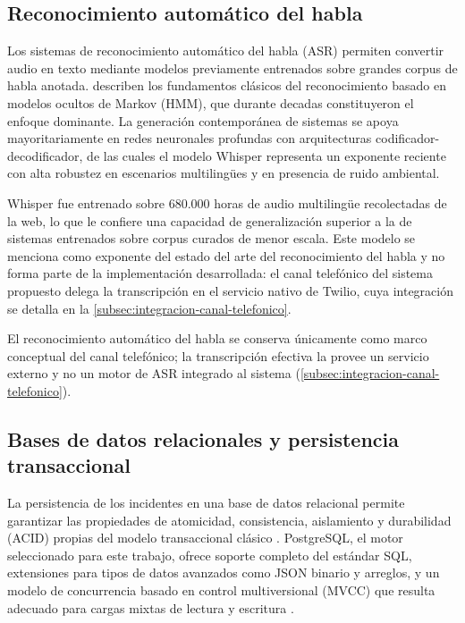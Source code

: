 \subsection{Reconocimiento automático del habla}\label{subsec:reconocimiento-habla}

Los sistemas de reconocimiento automático del habla (ASR) permiten convertir audio en texto mediante modelos previamente entrenados sobre grandes corpus de habla anotada. \textcite{Rabiner1993_speech_recognition} describen los fundamentos clásicos del reconocimiento basado en modelos ocultos de Markov (HMM), que durante decadas constituyeron el enfoque dominante. La generación contemporánea de sistemas se apoya mayoritariamente en redes neuronales profundas con arquitecturas codificador-decodificador, de las cuales el modelo Whisper \parencite{Radford2023_whisper} representa un exponente reciente con alta robustez en escenarios multilingües y en presencia de ruido ambiental.

Whisper fue entrenado sobre 680.000 horas de audio multilingüe recolectadas de la web, lo que le confiere una capacidad de generalización superior a la de sistemas entrenados sobre corpus curados de menor escala. Este modelo se menciona como exponente del estado del arte del reconocimiento del habla y no forma parte de la implementación desarrollada: el canal telefónico del sistema propuesto delega la transcripción en el servicio nativo de Twilio, cuya integración se detalla en la \autoref{subsec:integracion-canal-telefonico}.

El reconocimiento automático del habla se conserva únicamente como marco conceptual del canal telefónico; la transcripción efectiva la provee un servicio externo y no un motor de ASR integrado al sistema (\autoref{subsec:integracion-canal-telefonico}).

\subsection{Bases de datos relacionales y persistencia transaccional}\label{subsec:bd-relacionales}

La persistencia de los incidentes en una base de datos relacional permite garantizar las propiedades de atomicidad, consistencia, aislamiento y durabilidad (ACID) propias del modelo transaccional clásico \parencite{Date2003_database}. PostgreSQL, el motor seleccionado para este trabajo, ofrece soporte completo del estándar SQL, extensiones para tipos de datos avanzados como JSON binario y arreglos, y un modelo de concurrencia basado en control multiversional (MVCC) que resulta adecuado para cargas mixtas de lectura y escritura \parencite{PostgreSQL2024_docs}.

